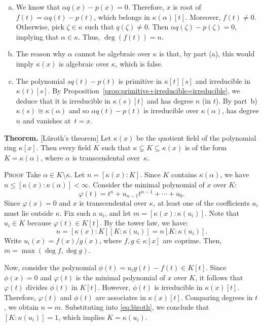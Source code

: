 \begin{solution}${}$
    \begin{enumerate}[a),font=\upshape]
        \item We know that $\alpha q(x)-p(x)=0$. Therefore, $x$ is root of $f(t)=\alpha q(t)-p(t)$, which belongs in $\kappa(\alpha)[t]$. Moreover, $f(t)\ne0$. Otherwise, pick $\zeta\in\kappa$ such that $q(\zeta)\ne0$. Then $\alpha q(\zeta)-p(\zeta)=0$, implying that $\alpha\in\kappa$. Thus, $\deg(f(t))=n$.

        \item The reason why $\alpha$ cannot be algebraic over $\kappa$ is that, by part (a), this would imply $\kappa(x)$ is algebraic over $\kappa$, which is false.

        \item The polynomial $sq(t)-p(t)$ is primitive in $\kappa[t][s]$ and irreducible in $\kappa(t)[s]$. By Proposition~\ref{prop:primitive+irreducible=irreducible}, we deduce that it is irreducible in $\kappa(s)[t]$ and has degree $n$ (in $t$). By part~b) $\kappa(s)\cong\kappa(\alpha)$ and so $\alpha q(t)-p(t)$ is irreducible over $\kappa(\alpha)$, has degree $n$ and vanishes at~$t=x$.
    \end{enumerate}

    \textbf{Theorem.} {\rm[L\"uroth's theorem]} 
        Let\/ $\kappa(x)$ be the quotient field of the polynomial ring\/ $\kappa[x]$. Then every field\/ $K$ such that\/ $\kappa\varsubsetneq K\subseteq\kappa(x)$ is of the form\/ $K=\kappa(\alpha)$, where\/ $\alpha$ is transcendental over\/~$\kappa$.
    
    \textsc{Proof}
    Take $\alpha \in K \setminus \kappa$. Let $n = [\kappa(x) : K]$. Since $K$ contains $\kappa(\alpha)$, we have $n \leq [\kappa(x) : \kappa(\alpha)] < \infty$. Consider the minimal polynomial of $x$ over $K$:
    $$
        \varphi(t)=t^n+u_{n-1}t^{n-1}+\cdots+u_0.
    $$
    Since $\varphi(x) = 0$ and $x$ is transcendental over $\kappa$, at least one of the coefficients $u_i$ must lie outside $\kappa$. Fix such a $u_i$, and let $m = [\kappa(x) : \kappa(u_i)]$. Note that $u_i \in K$ because $\varphi(t) \in K[t]$. By the tower law, we have:
    \begin{equation}\label{eq:lüroth}
        n=[\kappa(x):K][K:\kappa(u_i)]=n[K : \kappa(u_i)].
    \end{equation}
    Write $u_i(x)=f(x)/g(x)$, where $f, g \in \kappa[x]$ are coprime. Then, $m = \max(\deg f, \deg g)$.
    
    Now, consider the polynomial $\phi(t) = u_i g(t) - f(t) \in K[t]$. Since $\phi(x) = 0$ and $\varphi(t)$ is the minimal polynomial of $x$ over $K$, it follows that $\varphi(t)$ divides $\phi(t)$ in $K[t]$. However, $\phi(t)$ is irreducible in $\kappa(x)[t]$. Therefore, $\varphi(t)$ and $\phi(t)$ are associates in $\kappa(x)[t]$. Comparing degrees in $t$, we obtain $n = m$. Substituting into \eqref{eq:lüroth}, we conclude that $[K : \kappa(u_i)] = 1$, which implies $K = \kappa(u_i)$.
            
\end{solution}


